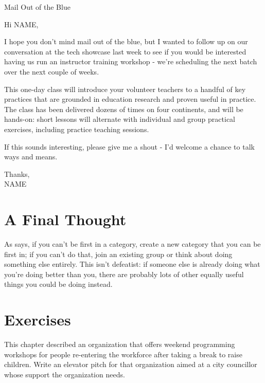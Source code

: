 \begin{callout}{Mail Out of the Blue}

  \noindent
  Hi NAME,

  I hope you don't mind mail out of the blue, but I wanted to follow
  up on our conversation at the tech showcase last week to see if you
  would be interested having us run an instructor training workshop -
  we're scheduling the next batch over the next couple of weeks.

  This one-day class will introduce your volunteer teachers to a
  handful of key practices that are grounded in education research and
  proven useful in practice. The class has been delivered dozens of
  times on four continents, and will be hands-on: short lessons will
  alternate with individual and group practical exercises, including
  practice teaching sessions.

  If this sounds interesting, please give me a shout - I'd welcome a
  chance to talk ways and means.

  Thanks,\\
  NAME

\end{callout}

\section{A Final Thought}\label{s:marketing-final}

As \cite{Kuch2011} says, if you can't be first in a category, create a
new category that you can be first in; if you can't do that, join an
existing group or think about doing something else entirely. This
isn't defeatist: if someone else is already doing what you're doing
better than you, there are probably lots of other equally useful
things you could be doing instead.

\section{Exercises}\label{s:marketing-exercises}


This chapter described an organization that offers weekend programming
workshops for people re-entering the workforce after taking a break to
raise children. Write an elevator pitch for that organization aimed at
a city councillor whose support the organization needs.


